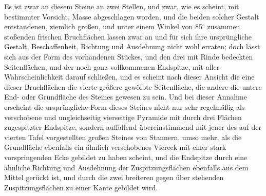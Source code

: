 \documentclass[a4paper, 11pt, oneside, german]{article}
\begin{document}
Es ist zwar an diesem Steine an zwei Stellen, und zwar, wie es scheint, mit bestimmter Vorsicht, Masse abgeschlagen worden, und die beiden solcher Gestalt entstandenen, ziemlich großen, und unter einem Winkel von 85$^{\circ}$ zusammen stoßenden frischen Bruchflächen lassen zwar an und für sich ihre ursprüngliche Gestalt, Beschaffenheit, Richtung und Ausdehnung nicht wohl erraten; doch lässt sich aus der Form des vorhandenen Stückes, und den drei mit Rinde bedeckten Seitenflächen, und der noch ganz vollkommenen Endspitze, mit aller Wahrscheinlichkeit darauf schließen, und es scheint nach dieser Ansicht die eine dieser Bruchflächen die vierte größere gewölbte Seitenfläche, die andere die untere End- oder Grundfläche des Steines gewesen zu sein. Und bei dieser Annahme erscheint die ursprüngliche Form dieses Steines nicht nur sehr regelmäßig als verschobene und ungleichseitig vierseitige Pyramide mit durch drei Flächen zugespitzter Endspitze, sondern auffallend übereinstimmend mit jener des auf der vierten Tafel vorgestellten großen Steines von Stannern, umso mehr, als die Grundfläche ebenfalls ein ähnlich verschobenes Viereck mit einer stark vorspringenden Ecke gebildet zu haben scheint, und die Endspitze durch eine ähnliche Richtung und Ausdehnung der Zuspitzungsflächen ebenfalls aus dem Mittel gerückt ist, und durch die zwei breiteren gegen über stehenden Zuspitzungsflächen zu einer Kante gebildet wird.
\end{document}
